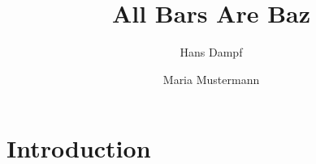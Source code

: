 \documentclass{llncs}
\begin{document}
    \title{All Bars Are Baz}
    \author{Hans Dampf \and Maria Mustermann}
    \maketitle
    
  \begin{abstract}
  	\lipsum[1-3]
  \end{abstract}

	\section{Introduction}
	
	\lipsum[4-10]
\end{document}
